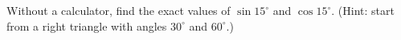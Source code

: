 Without a calculator, find the exact values of $\sin15^\circ$ and $\cos15^\circ$. (Hint: start from a right triangle with angles $30^\circ$ and $60^\circ$.)
